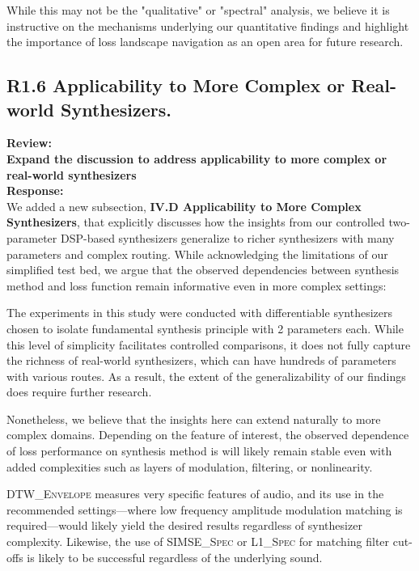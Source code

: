 \documentclass[11pt]{article}
\newcommand{\DTWEnv}{\textsc{DTW\_Envelope}}
\newcommand{\SIMSESpec}{\textsc{SIMSE\_Spec}}
\newcommand{\LoneSpec}{\textsc{L1\_Spec}}
\begin{document}
While this may not be the "qualitative" or "spectral" analysis, we believe it is instructive on the mechanisms underlying our quantitative findings and highlight the importance of loss landscape navigation as an open area for future research.

\subsection*{R1.6 Applicability to More Complex or Real-world Synthesizers.}
\label{R1.6}
\noindent\textbf{Review:} \\
\noindent \textbf{Expand the discussion to address applicability to more complex or real-world synthesizers}
\\

\noindent\textbf{Response:} \\
We added a new subsection, \textbf{IV.D Applicability to More Complex Synthesizers}, that explicitly discusses how the insights from our controlled two-parameter DSP-based synthesizers generalize to richer synthesizers with many parameters and complex routing. While acknowledging the limitations of our simplified test bed, we argue that the observed dependencies between synthesis method and loss function remain informative even in more complex settings:

\begin{displayquote}
    The experiments in this study were conducted with differentiable synthesizers chosen to isolate fundamental synthesis principle with 2 parameters each. While this level of simplicity facilitates controlled comparisons, it does not fully capture the richness of real-world synthesizers, which can have hundreds of parameters with various routes. As a result, the extent of the generalizability of our findings does require further research. 

    Nonetheless, we believe that the insights here can extend naturally to more complex domains. Depending on the feature of interest, the observed dependence of loss performance on synthesis method is will likely remain stable even with added complexities such as layers of modulation, filtering, or nonlinearity. 
    
    \DTWEnv{} measures very specific features of audio, and its use in the recommended settings---where low frequency amplitude modulation matching is required---would likely yield the desired results regardless of synthesizer complexity. Likewise, the use of \SIMSESpec{} or \LoneSpec{} for matching filter cut-offs is likely to be successful regardless of the underlying sound. 
    \end{displayquote}
    
\end{document}
